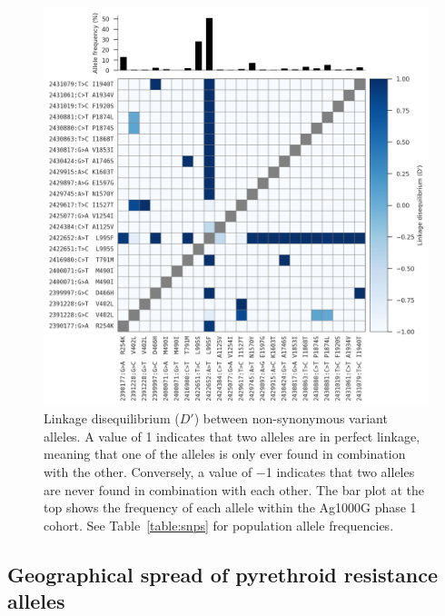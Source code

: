 \begin{refsection}
\begin{figure}[t!]
\centering
\includegraphics[width=0.9\linewidth,center]{artwork/chapter6/ld.png}
\caption{Linkage disequilibrium ($D'$) between non-synonymous variant alleles.
%
A value of 1 indicates that two alleles are in perfect linkage, meaning that one of the alleles is only ever found in combination with the other.
%
Conversely, a value of −1 indicates that two alleles are never found in combination with each other.
%
The bar plot at the top shows the frequency of each allele within the Ag1000G phase 1 cohort.
%
See Table~\ref{table:snps} for population allele frequencies.
}
\label{fig:ld}
\end{figure}


\subsection{Geographical spread of pyrethroid resistance alleles}\label{subsec:results-spread}



\end{refsection}
